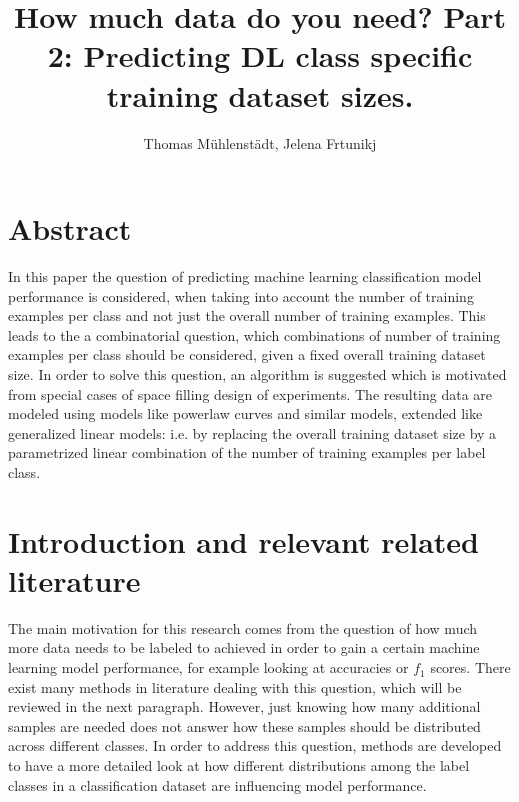 \documentclass{article} %
\title{How much data do you need? Part 2: Predicting DL class specific training dataset sizes.}
\author{Thomas Mühlenstädt, Jelena Frtunikj}
\begin{document}
\maketitle

\section*{Abstract}

In this paper the question of predicting machine learning classification model performance is considered, when taking into account the number of training examples per class and not just the overall number of training examples.
This leads to the a combinatorial question, which combinations of number of training examples per class should be considered, given a fixed overall training dataset size. In order to solve this question, an algorithm is suggested which is motivated from special cases of space filling design of experiments.
The resulting data are modeled using models like powerlaw curves and similar models, extended like generalized linear models: i.e. by replacing the overall training dataset size by a parametrized linear combination of the number of  training examples per label class.

\section{Introduction and relevant related literature}

The main motivation for this research comes from the question of how much more data needs to be labeled to achieved in order to gain a certain machine learning model performance, for example looking at accuracies or $f_1$ scores. There exist many methods in literature dealing with this question, which will be reviewed in the next paragraph. However, just knowing how many additional samples are needed does not answer how these samples should be distributed across different classes. In order to address this question, methods are developed to have a more detailed look at how different distributions among the label classes in a classification dataset are influencing model performance.
\end{document}
